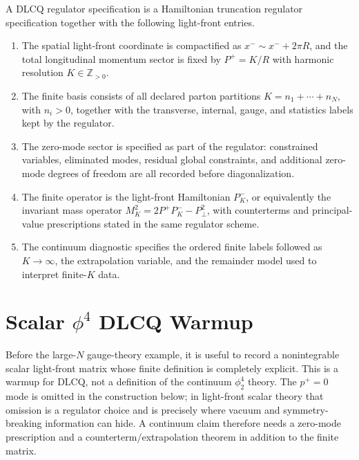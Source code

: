 \begin{definition}
\label{def:dlcq-regulator-datum}
A DLCQ regulator specification is a Hamiltonian truncation regulator
specification together
with the following light-front entries.
\begin{enumerate}[label=\textnormal{(\roman*)}]
\item The spatial light-front coordinate is compactified as
  \(x^-\sim x^-+2\pi R\), and the total longitudinal momentum sector is fixed
  by \(P^+=K/R\) with harmonic resolution \(K\in\mathbb Z_{>0}\).
\item The finite basis consists of all declared parton partitions
  \(K=n_1+\cdots+n_N\), with \(n_i>0\), together with the transverse,
  internal, gauge, and statistics labels kept by the regulator.
\item The zero-mode sector is specified as part of the regulator: constrained
  variables, eliminated modes, residual global constraints, and additional
  zero-mode degrees of freedom are all recorded before diagonalization.
\item The finite operator is the light-front Hamiltonian \(P^-_K\), or
  equivalently the invariant mass operator
  \(M_K^2=2P^+P^-_K-P_\perp^2\), with counterterms and principal-value
  prescriptions stated in the same regulator scheme.
\item The continuum diagnostic specifies the ordered finite labels followed as
  \(K\to\infty\), the extrapolation variable, and the remainder model used to
  interpret finite-\(K\) data.
\end{enumerate}
\end{definition}

\section{\texorpdfstring{Scalar \(\phi^4\) DLCQ Warmup}{Scalar phi4 DLCQ Warmup}}
\label{sec:scalar-phi4-dlcq-warmup}

Before the large-\(N\) gauge-theory example, it is useful to record a
nonintegrable scalar light-front matrix whose finite definition is completely
explicit.  This is a warmup for DLCQ, not a definition of the continuum
\(\phi^4_2\) theory.  The \(p^+=0\) mode is omitted in the construction
below; in light-front scalar theory that omission is a regulator choice and
is precisely where vacuum and symmetry-breaking information can hide.  A
continuum claim therefore needs a zero-mode prescription and a
counterterm/extrapolation theorem in addition to the finite matrix.

